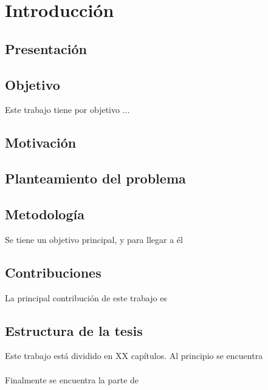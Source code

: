 \chapter*{Introducción}

%

\section*{Presentación} %
\blindtext



\section*{Objetivo}

Este trabajo tiene por objetivo ...
\blindtext


\section*{Motivación}
\blindtext

\section*{Planteamiento del problema}
\blindtext

\section*{Metodología}

Se tiene un objetivo principal, y para llegar a \'el %
\blindtext

\section*{Contribuciones}

La principal contribución de este trabajo es 
\blindtext

\section*{Estructura de la tesis}

Este trabajo está dividido en XX capítulos. Al principio se encuentra 
\\\\
Finalmente se encuentra la parte de 